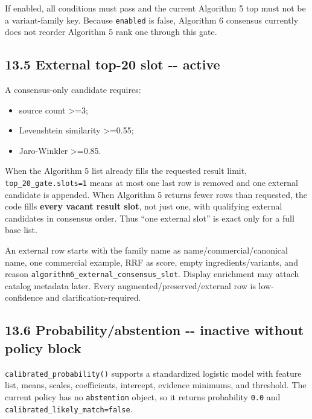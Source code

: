 If enabled, all conditions must pass and the current Algorithm 5 top must not be a variant-family key. Because \texttt{enabled} is false, Algorithm 6 consensus currently does not reorder Algorithm 5 rank one through this gate.

\subsection{13.5 External top-20 slot -\/- active}\label{135-external-top-20-slot----active}

A consensus-only candidate requires:

\begin{itemize}
\tightlist
\item
  source count \textgreater=3;
\item
  Levenshtein similarity \textgreater=0.55;
\item
  Jaro-Winkler \textgreater=0.85.
\end{itemize}

When the Algorithm 5 list already fills the requested result limit, \texttt{top\_\allowbreak{}20\_\allowbreak{}gate.slots=1} means at most one last row is removed and one external candidate is appended. When Algorithm 5 returns fewer rows than requested, the code fills \textbf{every vacant result slot}, not just one, with qualifying external candidates in consensus order. Thus ``one external slot'' is exact only for a full base list.

An external row starts with the family name as name/commercial/canonical name, one commercial example, RRF as score, empty ingredients/variants, and reason \texttt{algorithm6\_\allowbreak{}external\_\allowbreak{}consensus\_\allowbreak{}slot}. Display enrichment may attach catalog metadata later. Every augmented/preserved/external row is low-confidence and clarification-required.

\subsection{13.6 Probability/abstention -\/- inactive without policy block}\label{136-probabilityabstention----inactive-without-policy-block}

\texttt{calibrated\_\allowbreak{}probability()} supports a standardized logistic model with feature list, means, scales, coefficients, intercept, evidence minimums, and threshold. The current policy has no \texttt{abstention} object, so it returns probability \texttt{0.0} and \texttt{calibrated\_\allowbreak{}likely\_\allowbreak{}match=false}.

